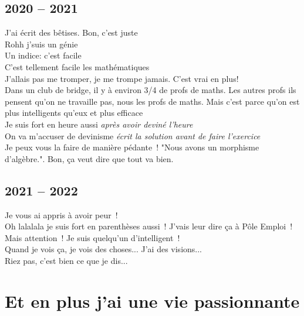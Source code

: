 \documentclass[french, a4paper, openany]{book}
\begin{document}
	\subsection*{2020 -- 2021}
		\noindent \og J'ai écrit des bêtises. Bon, c'est juste \fg \\
		\og Rohh j'suis un génie \fg \\
		\og Un indice: c'est facile \fg \\
		\og C'est tellement facile les mathématiques \fg \\
		\og J'allais pas me tromper, je me trompe jamais. C'est vrai en plus! \fg \\
		\og Dans un club de bridge, il y à environ 3/4 de profs de maths. Les autres profs ils pensent qu'on ne travaille pas, nous les profs de maths. Mais c'est parce qu'on est plus intelligents qu'eux et plus efficace \fg \\
		\og Je suis fort en heure aussi \fg \emph{après avoir deviné l'heure} \\
		\og On va m'accuser de devinisme \fg \emph{écrit la solution avant de faire l'exercice} \\
		\og Je peux vous la faire de manière pédante~! "Nous avons un morphisme d'algèbre.". Bon, ça veut dire que tout va bien. \fg \\
		
	\subsection*{2021 -- 2022}
		\noindent \og Je vous ai appris à avoir peur~! \fg \\
		\og Oh lalalala je suis fort en parenthèses aussi~! J'vais leur dire ça à Pôle Emploi~! \fg \\
		\og Mais attention~! Je suis quelqu'un d'intelligent~! \fg \\
		\og Quand je vois ça, je vois des choses... J'ai des visions... \fg \\
		\og Riez pas, c'est bien ce que je dis... \fg \\

\section*{Et en plus j'ai une vie passionnante}
\end{document}
